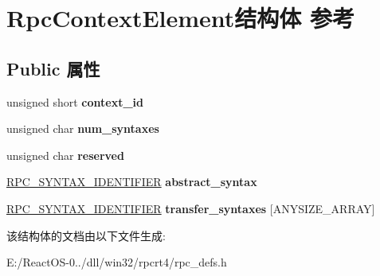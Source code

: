 \hypertarget{struct_rpc_context_element}{}\section{Rpc\+Context\+Element结构体 参考}
\label{struct_rpc_context_element}
\subsection*{Public 属性}
\begin{DoxyCompactItemize}
\item 
\mbox{\label{struct_rpc_context_element_a34543290a8f474c6b7ac0d3f2f55d7bc}} 
unsigned short {\bfseries context\+\_\+id}
\item 
\mbox{\label{struct_rpc_context_element_ae59b20035bc8c096fe4b0df2f391f911}} 
unsigned char {\bfseries num\+\_\+syntaxes}
\item 
\mbox{\label{struct_rpc_context_element_a551c7d3e9d94b5895c1f2241af0d896d}} 
unsigned char {\bfseries reserved}
\item 
\mbox{\label{struct_rpc_context_element_a8624239b19edf0609baa19b3b3d8df36}} 
\hyperlink{struct___r_p_c___s_y_n_t_a_x___i_d_e_n_t_i_f_i_e_r}{R\+P\+C\+\_\+\+S\+Y\+N\+T\+A\+X\+\_\+\+I\+D\+E\+N\+T\+I\+F\+I\+ER} {\bfseries abstract\+\_\+syntax}
\item 
\mbox{\label{struct_rpc_context_element_a3f9b0793dfe002ebddcb8b4dae9e3de3}} 
\hyperlink{struct___r_p_c___s_y_n_t_a_x___i_d_e_n_t_i_f_i_e_r}{R\+P\+C\+\_\+\+S\+Y\+N\+T\+A\+X\+\_\+\+I\+D\+E\+N\+T\+I\+F\+I\+ER} {\bfseries transfer\+\_\+syntaxes} \mbox{[}A\+N\+Y\+S\+I\+Z\+E\+\_\+\+A\+R\+R\+AY\mbox{]}
\end{DoxyCompactItemize}


该结构体的文档由以下文件生成\+:\begin{DoxyCompactItemize}
\item 
E\+:/\+React\+O\+S-\/0../dll/win32/rpcrt4/rpc\+\_\+defs.\+h\end{DoxyCompactItemize}
